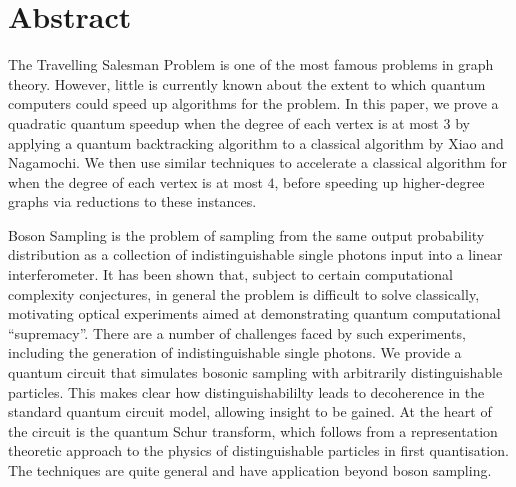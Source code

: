 \chapter*{Abstract}

The Travelling Salesman Problem is one of the most famous problems in graph theory. However, little is currently known about the extent to which quantum computers could speed up algorithms for the problem. In this paper, we prove a quadratic quantum speedup when the degree of each vertex is at most $3$ by applying a quantum backtracking algorithm to a classical algorithm by Xiao and Nagamochi. We then use similar techniques to accelerate a classical algorithm for when the degree of each vertex is at most $4$, before speeding up higher-degree graphs via reductions to these instances.

Boson Sampling is the problem of sampling from the same output probability distribution as a collection of indistinguishable single photons input into a linear interferometer. 
It has been shown that, subject to certain computational complexity conjectures, in general the problem is difficult to solve classically, motivating optical experiments aimed at demonstrating quantum computational ``supremacy''.
There are a number of challenges faced by such experiments, including the generation of indistinguishable single photons.
We provide a quantum circuit that simulates bosonic sampling with arbitrarily distinguishable particles.
This makes clear how distinguishabililty leads to decoherence in the standard quantum circuit model, allowing insight to be gained.
At the heart of the circuit is the quantum Schur transform, which follows from a representation theoretic approach to the physics of distinguishable particles in first quantisation.
The techniques are quite general and have application beyond boson sampling.
